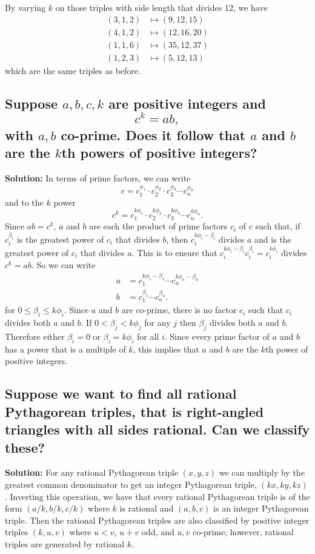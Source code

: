\documentclass{article}
\newcommand{\exercise}[1]{\subsection{\normalfont #1}}
\newcommand{\solution}{\indent\indent \textbf{Solution: }}
\begin{document}
\indent By varying $k$ on those triples with side length that divides 12, we have
\begin{align*}
(3,1,2) &\mapsto (9, 12, 15) \\
(4,1,2) &\mapsto (12,16,20)\\
(1,1,6) &\mapsto (35,12,37) \\
(1,2,3) &\mapsto (5,12,13)
\end{align*}
which are the same triples as before.

\exercise{Suppose $a,b,c,k$ are positive integers and $$c^k = ab,$$ with $a,b$ co-prime. Does it follow that $a$ and $b$ are the $k$th powers of positive integers?}
\solution
In terms of prime factors, we can write
$$c = c_1^{\phi_1} \cdot c_2^{\phi_2} \cdot c_3^{\phi_3} \cdots c_n^{\phi_n}$$
and to the $k$ power
$$c^k = c_1^{k\phi_1}\cdot c_2^{k\phi_2}\cdot c_3^{k\phi_3}\cdots c_n^{k\phi_n}.$$
\indent Since $ab = c^k$, $a$ and $b$ are each the product of prime factors $c_i$ of $c$ such that, if $c_i^{\beta_i}$ is the greatest power of $c_i$ that divides $b$, then $c_i^{k\phi_i - \beta_i}$ divides $a$ and is the greatest power of $c_i$ that divides $a$. This is to ensure that $c_i^{k\phi_i - \beta_i}c_i^{\beta_i} = c_i^{k\phi_i}$ divides $c^k =ab$. So we can write 
\begin{align*}
a &= c_1^{k\phi_1-\beta_1}\cdots c_n^{k\phi_n -\beta_n} \\
b &= c_1^{\beta_1}\cdots c_n^{\beta_n}.
\end{align*}
for $0 \leq \beta_i \leq k\phi_i$. Since $a$ and $b$ are co-prime, there is no factor $c_i$ such that $c_i$ divides both $a$ and $b$. If $0 < \beta_j<k\phi_j$ for any $j$ then $\beta_j$ divides both $a$ and $b$. Therefore either $\beta_i= 0$ or $\beta_i = k\phi_i$ for all $i$. Since every prime factor of $a$ and $b$ has a power that is a multiple of $k$, this implies that $a$ and $b$ are the $k$th power of positive integers.

\exercise{Suppose we want to find all rational Pythagorean triples, that is right-angled triangles with all sides rational. Can we classify these?}
\solution
For any rational Pythagorean triple $(x, y, z)$ we can multiply by the greatest common denominator to get an integer Pythagorean triple, $(kx, ky, kz)$. Inverting this operation, we have that every rational Pythagorean triple is of the form $(a/k, b/k, c/k)$ where $k$ is rational and $(a, b, c)$ is an integer Pythagorean triple. Then the rational Pythagorean triples are also classified by positive integer triples $(k, u, v)$ where $u<v$, $u+v$ odd, and $u, v$ co-prime; however, rational triples are generated by rational $k$. 
\end{document}
